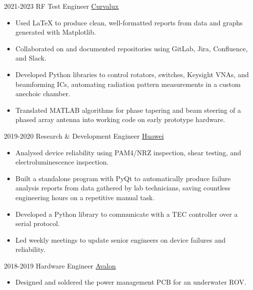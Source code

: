 \documentclass[9pt]{developercv} %
\begin{document}
\begin{entrylist}
		\entry
			{2021-2023}
			{RF Test Engineer}
			{\href{https://Curvalux.com}{Curvalux}}
			{	
				\begin{itemize}
					\item[$\bullet$\hspace*{0.5cm}] Used LaTeX to produce clean, well-formatted reports from data and graphs generated with Matplotlib. 
					\item[$\bullet$\hspace*{0.5cm}] Collaborated on and documented repositories using GitLab, Jira, Confluence, and Slack.
					\item[$\bullet$\hspace*{0.5cm}] Developed Python libraries to control rotators, switches, Keysight VNAs, and beamforming ICs, automating radiation pattern measurements in a custom anechoic chamber.
					\item[$\bullet$\hspace*{0.5cm}] Translated MATLAB algorithms for phase tapering and beam steering of a phased array antenna into working code on early prototype hardware.				
				\end{itemize}
			}
		\entry
			{2019-2020}
			{Research \& Development Engineer}
			{\href{https://www.huawei.com/uk/contact-us}{Huawei}}
			{
				\begin{itemize}
					\item[$\bullet$\hspace*{0.5cm}] Analysed device reliability using PAM4/NRZ inspection, shear testing, and electroluminescence inspection.
					\item[$\bullet$\hspace*{0.5cm}] Built a standalone program with PyQt to automatically produce failure analysis reports from data gathered by lab technicians, saving countless engineering hours on a repetitive manual task.
					\item[$\bullet$\hspace*{0.5cm}] Developed a Python library to communicate with a TEC controller over a serial protocol.
					\item[$\bullet$\hspace*{0.5cm}] Led weekly meetings to update senior engineers on device failures and reliability.
				\end{itemize}
			}
			\entry
			{2018-2019}
			{Hardware Engineer}
			{\href{https://avalonrov.wixsite.com/avalonrov}{Avalon}}
			{
				\begin{itemize}
					\item[$\bullet$\hspace*{0.5cm}] Designed and soldered the power management PCB for an underwater ROV.

\end{itemize}}
\end{entrylist}
\end{document}
